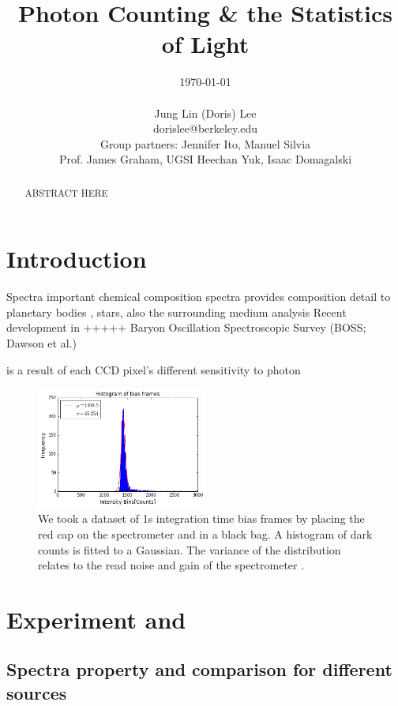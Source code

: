 \documentclass[authoryear, 12pt,5p, times]{elsarticle}
\begin{document}
\begin{frontmatter}
\title{Photon Counting \& the Statistics of Light}
\author{\today \\ \quad \\Jung Lin (Doris) Lee\\ dorislee@berkeley.edu\\Group partners: Jennifer Ito, Manuel Silvia\\Prof. James Graham, UGSI Heechan Yuk, Isaac Domagalski}
	\begin{abstract}
	ABSTRACT HERE
	\end{abstract}
\end{frontmatter}
\section{Introduction\label{intro}}
Spectra important chemical composition 
spectra provides composition detail to planetary bodies , stars, also the surrounding medium 
analysis
Recent development in +++++ Baryon Oscillation Spectroscopic Survey (BOSS; Dawson et al.)

is a result of each CCD pixel's different sensitivity to photon
\begin{figure}
\includegraphics[width=0.5\textwidth]{figures/bias_histo}
\caption{We took a dataset of 1s integration time bias frames by placing the red cap on the spectrometer and in a black bag. A histogram of dark counts is fitted to a Gaussian. The variance of the distribution relates to the read noise and gain of the spectrometer \citep{ccd_handbook}.}
\end{figure}
\section{Experiment and }
\subsection{Spectra property and comparison for different sources}
\end{document}
